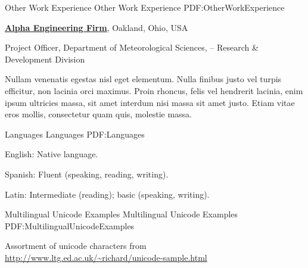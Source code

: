 \documentclass[letterpaper,MMMyyyy,nonstopmode]{simpleresumecv}
\begin{document}
\begin{Body}
{%

\Section
{Other Work\newline
Experience}
{Other Work Experience}
{PDF:OtherWorkExperience}

\Entry
\href{http://www.example.com/my-company}
{\textbf{Alpha Engineering Firm}},
Oakland, Ohio, USA

\Gap
\BulletItem
Project Officer,
Department of Meteorological Sciences,
\hfill
{} --
\newline
Research \& Development Division
\begin{Detail}
\SubBulletItem
Nullam venenatis egestas nisl eget elementum.
\SubBulletItem
Nulla finibus justo vel turpis efficitur, non lacinia orci maximus. Proin rhoncus, felis vel hendrerit lacinia, enim ipsum ultricies massa, sit amet interdum nisi massa sit amet justo.
\SubBulletItem
Etiam vitae eros mollis, consectetur quam quis, molestie massa.
\end{Detail}


\Section
{Languages}
{Languages}
{PDF:Languages}

\BulletItem
English: Native language.

\Gap
\BulletItem
Spanish: Fluent (speaking, reading, writing).

\Gap
\BulletItem
Latin: Intermediate (reading); basic (speaking, writing).





\Section
{Multilingual Unicode Examples}
{Multilingual Unicode Examples}
{PDF:MultilingualUnicodeExamples}

\BulletItem
Assortment of unicode characters from
\href{http://www.ltg.ed.ac.uk/~richard/unicode-sample.html}
{\url{http://www.ltg.ed.ac.uk/~richard/unicode-sample.html}}

}
\end{Body}
\end{document}
